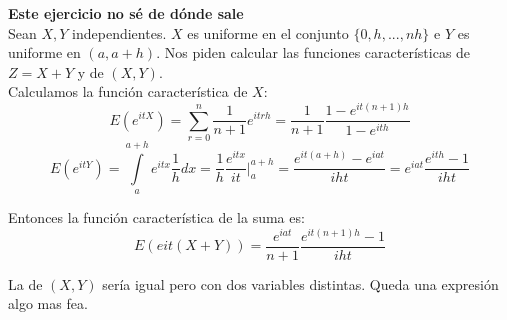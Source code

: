 \documentclass[openany]{book}
\begin{document}
\begin{exercise}
    \textbf{Este ejercicio no sé de dónde sale}\\ 

    Sean $ X,Y $ independientes. $ X $ es uniforme en el conjunto $ \{0,h,...,nh\} $ e $ Y $ es uniforme en $ (a,a+h) $. Nos piden calcular las funciones características  de $ Z = X+Y $ y de $ (X,Y) $.\\ 

    Calculamos la función característica de $ X $:
    $$ E(e^{itX}) = \sum\limits_{r=0}^{n}\dfrac{1}{n+1} e^{itrh} = \dfrac{1}{n+1} \dfrac{1-e^{it(n+1)h}}{1-e^{ith}} $$
    $$ E(e^{itY}) = \int\limits_{a}^{a+h} e^{itx}\dfrac{1}{h}dx = \dfrac{1}{h} \dfrac{e^{itx}}{it} \Biggr|_{a}^{a+h} = \dfrac{e^{it(a+h)}-e^{iat}}{iht} = e^{iat}\dfrac{e^{ith}-1}{iht} $$

    Entonces la función característica de la suma es:
    $$ E(eit(X+Y)) = \dfrac{e^{iat}}{n+1}\dfrac{e^{it(n+1)h}-1}{iht} $$

    La de $ (X,Y) $ sería igual pero con dos variables distintas. Queda una expresión algo mas fea.
\end{exercise}
\end{document}
